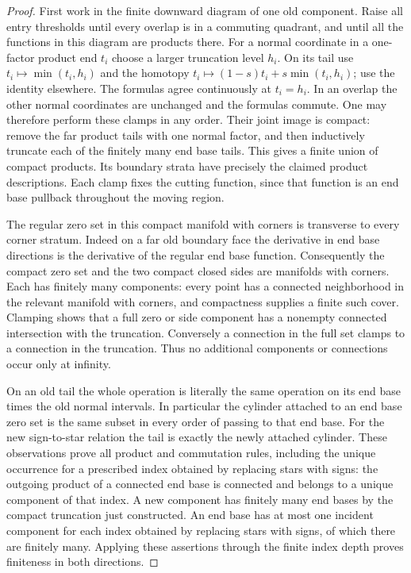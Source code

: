 \begin{proof}
First work in the finite downward diagram of one old component.  Raise
all entry thresholds until every overlap is in a commuting quadrant,
and until all the functions in this diagram are products there.
For a normal coordinate in a one-factor product end $t_i$ choose a larger truncation level $h_i$.
On its tail use
$t_i\mapsto\min(t_i,h_i)$ and the homotopy
$t_i\mapsto(1-s)t_i+s\min(t_i,h_i)$; use the identity elsewhere.
The formulas agree continuously at $t_i=h_i$.  In an overlap the
other normal coordinates are unchanged and the formulas commute.
One may therefore perform these clamps in any order.  Their joint image
is compact: remove the far product tails with one normal factor, and then inductively
truncate each of the finitely many end base tails.  This gives a finite
union of compact products.  Its boundary strata have precisely the
claimed product descriptions.  Each clamp fixes the cutting function,
since that function is an end base pullback throughout the moving region.

The regular zero set in this compact manifold with corners is transverse
to every corner stratum.  Indeed on a far old boundary face the derivative in
end base directions is the derivative of the regular end base function.
Consequently the compact zero set and the two compact closed sides are
manifolds with corners.  Each has finitely many components: every point
has a connected neighborhood in the relevant manifold with corners,
and compactness supplies a finite such cover.  Clamping shows that a
full zero or side component has a nonempty connected intersection with
the truncation.  Conversely a connection in the full set clamps to a
connection in the truncation.  Thus no additional components or
connections occur only at infinity.

On an old tail the whole operation is literally the same operation on
its end base times the old normal intervals.  In particular the cylinder
attached to an end base zero set is the same subset in every order of
passing to that end base.  For the new sign-to-star relation the tail is
exactly the newly attached cylinder.  These observations prove all
product and commutation rules, including the unique occurrence for
a prescribed index obtained by replacing stars with signs: the outgoing
product of a connected end base is connected and belongs to a unique
component of that index.
A new component has finitely many end bases by the compact truncation just
constructed.  An end base has at most one incident component for each index obtained by replacing stars with signs, of which there are finitely many.  Applying these assertions
through the finite index depth proves finiteness in both directions.


\end{proof}
